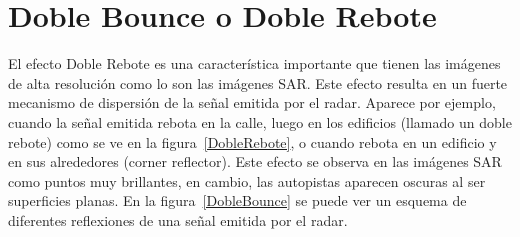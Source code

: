\section{Doble Bounce o Doble Rebote}
\label{SecDobleBounce}
El efecto Doble Rebote es una característica importante que tienen las  imágenes de alta resolución como lo son las imágenes SAR. Este efecto resulta en un fuerte mecanismo de dispersión de la señal emitida por el radar. Aparece por ejemplo, cuando la señal emitida rebota en la calle, luego en los edificios (llamado un doble rebote) como se ve en la figura~\ref{DobleRebote}, o cuando rebota en un edificio y en sus alrededores (corner reflector).  Este efecto se observa en las imágenes SAR como puntos muy brillantes, en cambio, las autopistas aparecen oscuras al ser superficies planas. En la figura~\ref{DobleBounce} se puede ver un esquema de diferentes reflexiones de una señal emitida por el radar.

